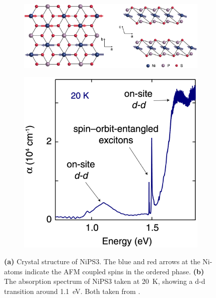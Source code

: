 \begin{figure}[ht]
    \centering
    \begin{subfigure}[c]{0.65\textwidth}
        \includegraphics[width=\textwidth]{pictures/12.png}
        \caption{}
        \label{fig:12}
    \end{subfigure}
    \hspace{0.3cm}
    \begin{subfigure}[c]{0.3\textwidth}
        \includegraphics[width=\textwidth]{pictures/8.png}
        \caption{}
        \label{fig:8}
    \end{subfigure}
    \vspace{-0.1cm}
    \caption{\textbf{(a)} Crystal structure of NiPS3. The blue and red arrows at the Ni-atoms indicate the AFM coupled spins in the ordered phase. \textbf{(b)} The absorption spectrum of NiPS3 taken at \qty{20}{K}, showing a d-d transition around \qty{1.1}{eV}. Both taken from \cite{belvin_exciton-driven_2021}.}
\end{figure}
\FloatBarrier


